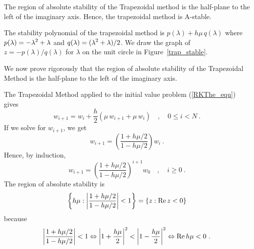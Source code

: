 
\begin{egg}
The region of absolute stability of the Trapezoidal method is the
half-plane to the left of the imaginary axis.  Hence, the trapezoidal
method is A-stable.

The stability polynomial of the trapezoidal method is
$p(\lambda) + h\mu\, q(\lambda)$ where
$\displaystyle p(\lambda) = -\lambda^2 + \lambda$ and
$\displaystyle q(\lambda) = (\lambda^2 + \lambda)/2$.
We draw the graph of $z = - p(\lambda)/q(\lambda)$ for $\lambda$ on
the unit circle in Figure~\ref{trap_stable}.

We now prove rigorously that the region of absolute stability of the
Trapezoidal Method is the half-plane to the left of the imaginary
axis.

The Trapezoidal Method applied to the initial value problem
(\ref{RKThe_equ}) gives
\[
w_{i+1} = w_i + \frac{h}{2}\left( \mu\, w_{i+1} + \mu\, w_i \right)
\quad , \quad 0 \leq i < N \ .
\]
If we solve for $w_{i+1}$, we get
\[
w_{i+1} = \left(\frac{1+h\mu/2}{1 - h\mu/2}\right) w_i \ .
\]
Hence, by induction,
\[
w_{i+1} = \left( \frac{1+h\mu/2}{1-h\mu/2} \right)^{i+1} w_0 \quad ,
\quad i \geq 0 \ .
\]
The region of absolute stability is
\[
\left\{ h\mu :
\bigg| \frac{1+h\mu/2}{1-h\mu/2} \bigg| <1 \right\} =
\left\{ z : \operatorname{Re} z < 0 \right\}
\]
because
\[
\bigg| \frac{1+h\mu/2}{1-h\mu/2} \bigg| <1 \Leftrightarrow
\bigg| 1+\frac{h\mu}{2} \bigg|^2 < \bigg| 1-\frac{h\mu}{2} \bigg|^2
\Leftrightarrow \operatorname{Re} h\mu < 0 \ .
\]
\end{egg}


